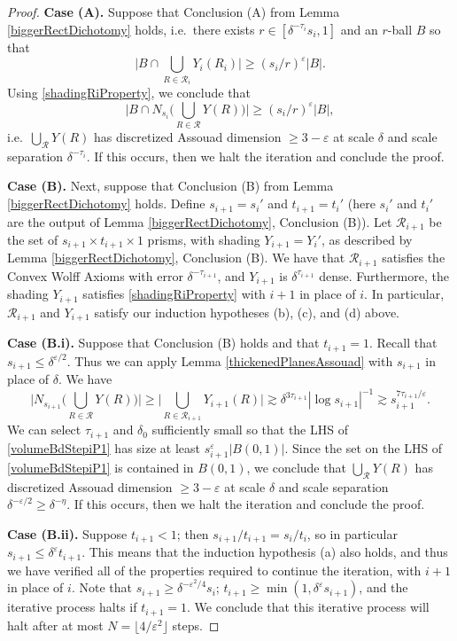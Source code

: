 \documentclass[letterpaper, reqno,11pt]{article}
\numberwithin{equation}{section}
\newcommand{\eps}{\varepsilon}
\numberwithin{thm}{section}
\theoremstyle{remark}
\begin{document}
\begin{proof}
\medskip

\noindent\textbf{Case (A).} Suppose that Conclusion (A) from Lemma \ref{biggerRectDichotomy} holds, i.e.~there exists $r\in [\delta^{-\tau_i}s_i, 1]$ and an $r$-ball $B$ so that 
\[
\Big| B \cap  \bigcup_{R\in\mathcal{R}_i}Y_i(R_i)\Big| \geq (s_i/r)^{\eps}|B|.
\]
Using \eqref{shadingRiProperty}, we conclude that
\[
\Big| B \cap  N_{s_i}\Big(\bigcup_{R\in\mathcal{R}}Y(R)\Big) \Big| \geq (s_i/r)^{\eps}|B|,
\]
i.e.~$\bigcup_{\mathcal{R}}Y(R)$ has discretized Assouad dimension $\geq 3-\eps$ at scale $\delta$ and scale separation $\delta^{-\tau_i}$. If this occurs, then we halt the iteration and conclude the proof.

\medskip

\noindent\textbf{Case (B).} Next, suppose that Conclusion (B) from Lemma \ref{biggerRectDichotomy} holds. Define $s_{i+1}=s_i'$ and $t_{i+1}=t_i'$ (here $s_i'$ and $t_i'$ are the output of Lemma \ref{biggerRectDichotomy}, Conclusion (B)). Let $\mathcal{R}_{i+1}$ be the set of $s_{i+1}\times t_{i+1}\times 1$ prisms, with shading $Y_{i+1}=Y_i'$, as described by Lemma \ref{biggerRectDichotomy}, Conclusion (B). We have that $\mathcal{R}_{i+1}$ satisfies the Convex Wolff Axioms with error $\delta^{-\tau_{i+1}}$, and $Y_{i+1}$ is $\delta^{\tau_{i+1}}$ dense. Furthermore, the shading $Y_{i+1}$ satisfies \eqref{shadingRiProperty} with $i+1$ in place of $i$. In particular, $\mathcal{R}_{i+1}$ and $Y_{i+1}$ satisfy our induction hypotheses (b), (c), and (d) above. 

\medskip

\noindent\textbf{Case (B.i).} Suppose that Conclusion (B) holds and that $t_{i+1}=1$. Recall that $s_{i+1}\leq\delta^{\eps/2}.$ Thus we can apply Lemma \ref{thickenedPlanesAssouad} with $s_{i+1}$ in place of $\delta$. We have
\begin{equation}\label{volumeBdStepiP1}
\Big|N_{s_{i+1}}\Big(\bigcup_{R\in\mathcal{R}}Y(R)\Big)\Big| \geq \Big|\bigcup_{R\in\mathcal{R}_{i+1}}Y_{i+1}(R)\Big|\gtrsim \delta^{3\tau_{i+1}}|\log s_{i+1}|^{-1}\gtrsim s_{i+1}^{7\tau_{i+1}/\eps}.
\end{equation}
We can select $\tau_{i+1}$ and $\delta_0$ sufficiently small so that the LHS of \eqref{volumeBdStepiP1} has size at least $s_{i+1}^\eps|B(0,1)|$. Since the set on the LHS of \eqref{volumeBdStepiP1} is contained in $B(0,1)$, we conclude that $\bigcup_{\mathcal{R}}Y(R)$ has discretized Assouad dimension $\geq 3-\eps$ at scale $\delta$ and scale separation $\delta^{-\eps/2}\geq\delta^{-\eta}.$ If this occurs, then we halt the iteration and conclude the proof.

\medskip

\noindent\textbf{Case (B.ii).} Suppose $t_{i+1}<1$; then $s_{i+1}/t_{i+1}=s_i/t_i$, so in particular $s_{i+1}\leq \delta^{\eps}t_{i+1}$. This means that the induction hypothesis (a) also holds, and thus we have verified all of the properties required to continue the iteration, with $i+1$ in place of $i$. Note that $s_{i+1}\geq\delta^{-\eps^2/4}s_i$; $t_{i+1}\geq\min(1, \delta^{\eps}s_{i+1})$, and the iterative process halts if $t_{i+1}=1$. We conclude that this iterative process will halt after at most $N = \lfloor 4/\eps^2\rfloor$ steps. 
\end{proof}
\end{document}
